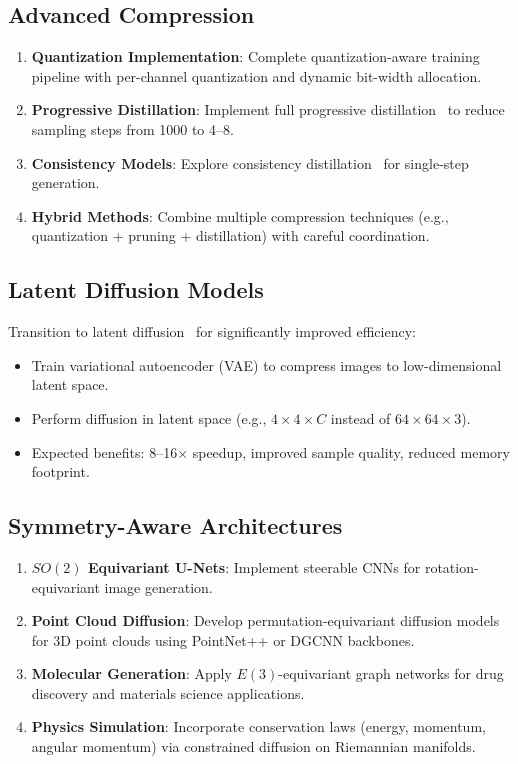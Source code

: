 \documentclass[12pt]{report}
\theoremstyle{definition}
\begin{document}
\subsection{Advanced Compression}

\begin{enumerate}
\item \textbf{Quantization Implementation}: Complete quantization-aware training pipeline with per-channel quantization and dynamic bit-width allocation.
\item \textbf{Progressive Distillation}: Implement full progressive distillation~\citep{salimans2022progressive} to reduce sampling steps from 1000 to 4--8.
\item \textbf{Consistency Models}: Explore consistency distillation~\citep{song2023consistency} for single-step generation.
\item \textbf{Hybrid Methods}: Combine multiple compression techniques (e.g., quantization + pruning + distillation) with careful coordination.
\end{enumerate}

\subsection{Latent Diffusion Models}

Transition to latent diffusion~\citep{rombach2022high} for significantly improved efficiency:

\begin{itemize}
\item Train variational autoencoder (VAE) to compress images to low-dimensional latent space.
\item Perform diffusion in latent space (e.g., $4 \times 4 \times C$ instead of $64 \times 64 \times 3$).
\item Expected benefits: 8--16$\times$ speedup, improved sample quality, reduced memory footprint.
\end{itemize}

\subsection{Symmetry-Aware Architectures}

\begin{enumerate}
\item \textbf{$SO(2)$ Equivariant U-Nets}: Implement steerable CNNs for rotation-equivariant image generation.
\item \textbf{Point Cloud Diffusion}: Develop permutation-equivariant diffusion models for 3D point clouds using PointNet++ or DGCNN backbones.
\item \textbf{Molecular Generation}: Apply $E(3)$-equivariant graph networks for drug discovery and materials science applications.
\item \textbf{Physics Simulation}: Incorporate conservation laws (energy, momentum, angular momentum) via constrained diffusion on Riemannian manifolds.
\end{enumerate}
\end{document}
